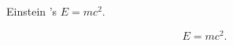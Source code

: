 \documentclass{article}
\begin{document}
Einstein 's $E=mc^2$.



\begin{equation}
E=mc^2.
\end{equation}
\end{document}

